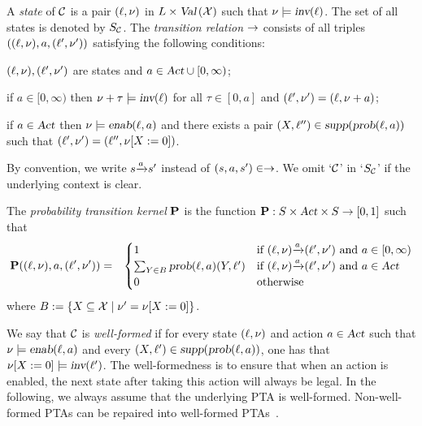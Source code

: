 \smallskip {}
A \emph{state} of $\mathcal{C}$ is a pair $(\ell, \nu)$ in $L\times\mbox{\sl Val}\left(\mathcal{X}\right)$ such that $\nu\models \mbox{\sl inv}(\ell)$.
The set of all states is denoted by $S_{\mathcal{C}}$.
The \emph{transition relation} $\rightarrow$ consists of all triples $((\ell,\nu),a,(\ell',\nu'))$ satisfying
the following conditions:
\begin{compactitem}
\item $(\ell,\nu), (\ell',\nu')$ are states and $a\in\mbox{\sl Act}\cup [0,\infty)$;
\item if $a\in [0,\infty)$ then $\nu+\tau\models \mbox{\sl inv}(\ell)$ for all $\tau\in [0, a]$ and $(\ell',\nu')=(\ell,\nu+a)$;
\item if $a\in\mbox{\sl Act}$ then $\nu\models\mbox{\sl enab}(\ell,a)$ and there exists a pair $(X, \ell'')\in{\mbox{\sl supp}}(\mbox{\sl prob}(\ell,a))$ such that $(\ell',\nu')=(\ell'',{\nu}{\left[X:=0\right]})$.
\end{compactitem}
By convention, we write ${s}{\xrightarrow{a}}{s'}$ instead of $(s,a,s')\in\rightarrow$.
We omit `$\mathcal{C}$' in `$S_{\mathcal{C}}$' if the underlying context is clear.

\smallskip {}
The \emph{probability transition kernel} $\mathbf{P}$ is the function $\mathbf{P}:S\times\mbox{\sl Act}\times S\rightarrow[0,1]$ such that
\begin{align*}
    & \mathbf{P}((\ell,\nu),a,(\ell',\nu'))
        = 
        & \begin{cases}
            1 &
                \mbox{if }{(\ell,\nu)}{\xrightarrow{a}}{(\ell',\nu')}\mbox{ and } a\in [0,\infty)\\
            \sum_{Y\in B}\mbox{\sl prob}(\ell,a)(Y,\ell') &
                \mbox{if }{(\ell,\nu)}{\xrightarrow{a}}{(\ell',\nu')}\mbox{ and } a\in\mbox{\sl Act} \\
            0 &
                \mbox{otherwise}
        \end{cases}
\end{align*}
where $B:=\{X\subseteq\mathcal{X}\mid \nu'={\nu}{\left[X:=0\right]}\}$.

\smallskip {} We say that $\mathcal{C}$ is \emph{well-formed} if for every state $(\ell,\nu)$ and action $a\in\mbox{\sl Act}$ such that $\nu\models\mbox{\sl enab}(\ell,a)$ and every $(X,\ell')\in {\mbox{\sl supp}}(\mbox{\sl prob}(\ell,a))$, one has that ${\nu}{\left[X:=0\right]}\models\mbox{\sl inv}(\ell')$.
The well-formedness is to ensure that when an action is enabled, the next state after taking this action will always be legal. In the following, we always assume that the underlying PTA is well-formed. Non-well-formed PTAs can be repaired into well-formed PTAs~\cite{DBLP:journals/iandc/KwiatkowskaNSW07}.

